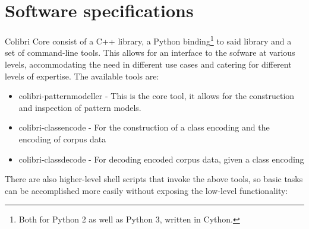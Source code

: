 
\section{Software specifications}

Colibri Core consist of a C++ library, a Python binding\footnote{Both for
Python 2 as well as Python 3, written in Cython.} to said library and a set of
command-line tools. This allows for an interface to the sofware at various
levels, accommodating the need in different use cases and catering for
different levels of expertise. The available tools are:

\begin{itemize}
    \item colibri-patternmodeller - This is the core tool, it allows for the
        construction and inspection of pattern models.
    \item colibri-classencode - For the construction of a class encoding and
        the encoding of corpus data
    \item colibri-classdecode - For decoding encoded corpus data, given a class
        encoding
\end{itemize}

There are also higher-level shell scripts that invoke the above tools, so basic
tasks can be accomplished more easily without exposing the low-level functionality:

